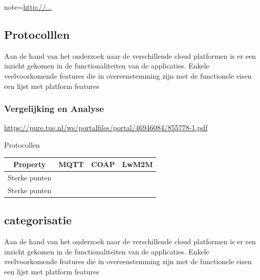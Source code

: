 
note={\url{http://...}}


 
\subsection{Protocolllen}
Aan de hand van het onderzoek naar de verschillende cloud platformen is er een inzicht gekomen in de functionaliteiten van de applicaties. Enkele veelvoorkomende features die in overeenstemming zijn met de functionele eisen een lijst met platform features


\subsubsection{Vergelijking en Analyse}

\url{https://pure.tue.nl/ws/portalfiles/portal/46946084/855778-1.pdf}
\begin{frame}{Protocollen}
	\begin{table}[htbp]
		\centering
		\begin{tabular}{|c|c|c|c|}\hline
			Property&MQTT&COAP&LwM2M \cite{wikibooks}\cite{wikibooks} \\\hline
			
			
			
			Sterke punten &\multicolumn{1}{m{2cm}|}{}&\multicolumn{1}{m{4cm}|}{}&
			\multicolumn{1}{m{4cm}|}{ }\\\hline
			
			Sterke punten &\multicolumn{1}{m{2cm}|}{ }&\multicolumn{1}{m{4cm}|}{}&
			\multicolumn{1}{m{4cm}|}{ }\\\hline
			
			
			
		\end{tabular}
	\end{table}
	
\end{frame}

\subsection{categorisatie}
Aan de hand van het onderzoek naar de verschillende cloud platformen is er een inzicht gekomen in de functionaliteiten van de applicaties. Enkele veelvoorkomende features die in overeenstemming zijn met de functionele eisen een lijst met platform features

